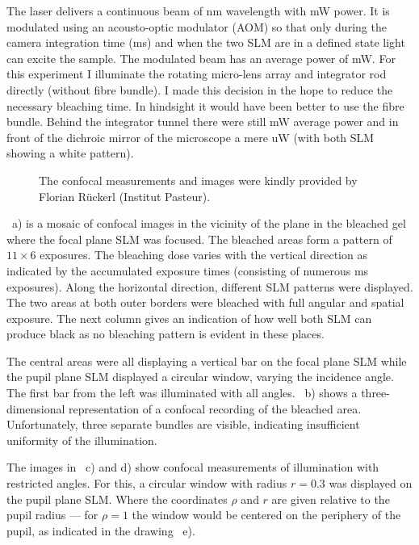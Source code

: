 
The laser delivers a continuous beam of \unit[473]{nm} wavelength with
\unit[400]{mW} power. It is modulated using an acousto-optic modulator
(AOM) so that only during the camera integration time (\unit[20]{ms})
and when the two SLM are in a defined state light can excite the
sample. The modulated beam has an average power of \unit[15]{mW}. For
this experiment I illuminate the rotating micro-lens array and
integrator rod directly (without fibre bundle). I made this decision
in the hope to reduce the necessary bleaching time. In hindsight it
would have been better to use the fibre bundle. Behind the integrator
tunnel there were still \unit[7]{mW} average power and in front of the
dichroic mirror of the microscope a mere \unit[17]{uW} (with both SLM
showing a white pattern).

\begin{figure}[hbtp]
  \centering
  \caption{The confocal measurements and images were kindly provided
    by Florian R\"uckerl (Institut Pasteur).}
  \label{fig:overview-bleach}
\end{figure}

~a) is a mosaic of confocal images in the
vicinity of the plane in the bleached gel where the focal plane SLM
was focused. The bleached areas form a pattern of $11\times 6$
exposures. The bleaching dose varies with the vertical direction as
indicated by the accumulated exposure times (consisting of numerous
\unit[20]{ms} exposures). Along the horizontal direction, different
SLM patterns were displayed. The two areas at both outer borders were
bleached with full angular and spatial exposure. The next column gives
an indication of how well both SLM can produce black as no bleaching
pattern is evident in these places.

The central areas were all displaying a vertical bar on the focal
plane SLM while the pupil plane SLM displayed a circular window,
varying the incidence angle. The first bar from the left was
illuminated with all angles. ~b) shows a
three-dimensional representation of a confocal recording of the
bleached area. Unfortunately, three separate bundles are visible,
indicating insufficient uniformity of the illumination.

The images in ~c) and d) show confocal
measurements of illumination with restricted angles. For this, a
circular window with radius $r=0.3$ was displayed on the pupil plane
SLM. Where the coordinates $\rho$ and $r$ are given relative to the
pupil radius --- for $\rho=1$ the window would be centered on the
periphery of the pupil, as indicated in the drawing
~e).




